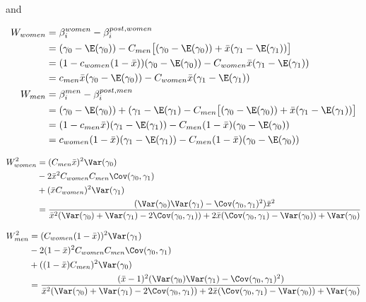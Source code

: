 and

\begin{align*}
	W_{women} &=  \beta_i^{women} - \beta_i^{post,women} \\
			&= (\gamma_0 - \E(\gamma_0)) - C_{men} \big[(\gamma_0 - \E(\gamma_0)) + \bar{x} ( \gamma_1 - \E(\gamma_1)) \big] \\
			&= ( 1 - c_{women}(1-\bar{x})) (\gamma_0 - \E(\gamma_0)) - C_{women} \bar{x} (\gamma_1 - \E(\gamma_1)) \\
			&= c_{men}\bar{x} (\gamma_0 - \E(\gamma_0)) - C_{women} \bar{x} (\gamma_1 - \E(\gamma_1)) \\
	W_{men} &=  \beta_i^{men} - \beta_i^{post,men} \\
			&= (\gamma_0 - \E(\gamma_0)) + (\gamma_1 - \E(\gamma_1) - C_{men} \big[(\gamma_0 - \E(\gamma_0)) + \bar{x} ( \gamma_1 - \E(\gamma_1)) \big] \\
			&= ( 1 - c_{men} \bar{x}) (\gamma_1 - \E(\gamma_1)) - C_{men} (1-\bar{x}) (\gamma_0 - \E(\gamma_0)) \\
			&=  c_{women} (1 - \bar{x}) (\gamma_1 - \E(\gamma_1)) - C_{men} (1-\bar{x}) (\gamma_0 - \E(\gamma_0))
\end{align*} 

\begin{align*}
	W_{women}^2 &= (C_{men} \bar{x})^2\Var(\gamma_0)\\
				& -  2 \bar{x} ^2 C_{women} C_{men}\Cov(\gamma_0, \gamma_1)  \\
				& + (\bar{x} C_{women})^2\Var(\gamma_1) \\
				&= \frac{ (\Var(\gamma_0) \Var(\gamma_1) - \Cov(\gamma_0, \gamma_1)^2) \bar{x}^2 }{ \bar{x}^2 (\Var(\gamma_0) + \Var(\gamma_1) - 2 \Cov(\gamma_0, \gamma_1)) + 2 \bar{x} (\Cov(\gamma_0, \gamma_1) - \Var(\gamma_0)) + \Var(\gamma_0) }
\end{align*} 


\begin{align*}
	W_{men}^2 &= (C_{women} (1-\bar{x}))^2\Var(\gamma_1)\\
			  & -  2 (1-\bar{x})^2 C_{women} C_{men}\Cov(\gamma_0, \gamma_1)  \\
				& + ((1-\bar{x}) C_{men})^2\Var(\gamma_0) \\
				&= \frac{ (\bar{x} - 1)^2 (\Var(\gamma_0) \Var(\gamma_1) - \Cov(\gamma_0, \gamma_1)^2) }{ \bar{x}^2 (\Var(\gamma_0) + \Var(\gamma_1) - 2 \Cov(\gamma_0, \gamma_1)) + 2 \bar{x} (\Cov(\gamma_0, \gamma_1) - \Var(\gamma_0)) + \Var(\gamma_0) }
\end{align*} 

